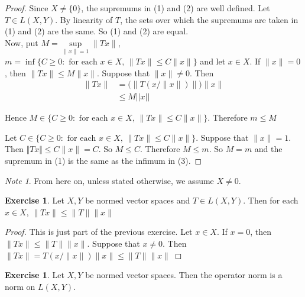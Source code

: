 \documentclass[12pt]{amsart}
\theoremstyle{definition}
\theoremstyle{remark}
\newtheorem{note}[remark]{Note}
\theoremstyle{definition}
\newtheorem{ex}[definition]{Exercise}
\begin{document}
	\begin{proof} Since $X \neq \{0\}$, the supremums in (1) and (2) are well defined. Let $T \in L(X,Y)$. By linearity of $T$, the sets over which the supremums are taken in (1) and (2) are the same. So (1) and (2) are equal.\vspace{1cm}\\
		
		Now, put $M = \sup\limits_{\|x \|=1} \|Tx \|$, $m = \inf \{C \geq 0: \text{ for each }x \in X\text{, } \|Tx \|\leq C \|x \|\}$ and let $x \in X$. If $\|x \|=0$, then $\|Tx \|\leq M \|x \|$. Suppose that $\|x \|\neq 0$. Then 
		\begin{align*}
			\|Tx \|
			&= \bigg(\big\|T(x/\|x\|)\big\|\bigg)\|x \|\\
			& \leq M ||x||
		\end{align*}
		
		Hence $M \in \{C \geq 0: \text{ for each }x \in X\text{, } \|Tx \|\leq C \|x \|\}$. Therefore $m \leq M$
		
		Let $C \in \{C \geq 0: \text{ for each }x \in X\text{, } \|Tx \|\leq C \|x\|\}$. Suppose that $\|x \|=1$. Then $\Vert Tx\Vert \leq C \|x \|= C$. So $M \leq C$. Therefore $M \leq m$. So $M=m$ and the supremum in (1) is the same as the infimum in (3). 
	\end{proof}
	
	\begin{note}
		From here on, unless stated otherwise, we assume $X \neq 0$.
	\end{note}
	
	\begin{ex}
		Let $X,Y$ be normed vector spaces and $T \in L(X,Y)$. Then for each $x \in X$, $\|Tx \| \leq \|T\|\|x \|$
	\end{ex}
	
	\begin{proof}
		This is just part of the previous exercise. Let $x \in X$. If $x = 0$, then $\|Tx \|\leq \|T \|\|x \|$. Suppose that $x \neq 0$. Then $\|Tx \|= T(x/\|x\|)\|x\|\leq \|T \|\|x \|$
	\end{proof}
	
	\begin{ex}
		Let $X, Y$ be normed vector spaces. Then the operator norm is a norm on $L(X,Y)$.
	\end{ex}
	
\end{document}
